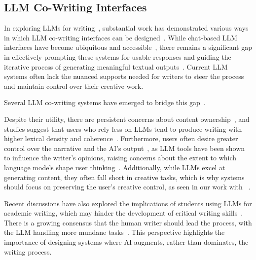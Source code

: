 \subsection{LLM Co-Writing Interfaces}
In exploring LLMs for writing~\cite{brown2020language, kenton2019bert, min2023recent, radford2018improving}, substantial work has demonstrated various ways in which LLM co-writing interfaces can be designed~\cite{Lee2024design}. While chat-based LLM interfaces have become ubiquitous and accessible~\cite{google2023gemini, openai2022chatgpt, anthropicclaude}, there remains a significant gap in effectively prompting these systems for usable responses and guiding the iterative process of generating meaningful textual outputs~\cite{zamfirescu2023johnny, kim2023towards}. Current LLM systems often lack the nuanced supports needed for writers to steer the process and maintain control over their creative work.


Several LLM co-writing systems have emerged to bridge this gap~\cite{biermann2022tool, buschek2021impact, chung2022talebrush, dang2023choice, gero2022sparks, gero2023social, giray2023prompt, goodman2022lampost, kim2023towards, lee2022coauthor, longtweetorial, mirowski2023co, shakeri2021saga, singh2023hide}. 

Despite their utility, there are persistent concerns about content ownership~\cite{hoque2024hallmark}, and studies suggest that users who rely less on LLMs tend to produce writing with higher lexical density and coherence~\cite{shibani2023visual}. Furthermore, users often desire greater control over the narrative and the AI's output~\cite{ippolito2022creative, poddar2023ai}, as LLM tools have been shown to influence the writer’s opinions, raising concerns about the extent to which language models shape user thinking~\cite{jakesch2023co}. Additionally, while LLMs excel at generating content, they often fall short in creative tasks, which is why systems should focus on preserving the user's creative control, as seen in our work with \system~\cite{chakrabarty2024art}.

Recent discussions have also explored the implications of students using LLMs for academic writing, which may hinder the development of critical writing skills~\cite{bowman2022new, meyer2023chatgpt, flower1980cognition}. There is a growing consensus that the human writer should lead the process, with the LLM handling more mundane tasks~\cite{wan2022user}. This perspective highlights the importance of designing systems where AI augments, rather than dominates, the writing process.

